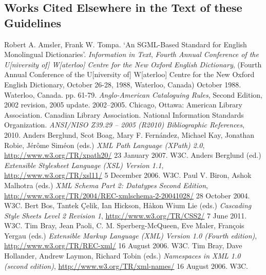 \subsection[{Works Cited Elsewhere in the Text of these Guidelines}]{Works Cited Elsewhere in the Text of these Guidelines}\begin{bibitemlist}{1}
\label{DI-BIBL-1}Robert A. Amsler, Frank W. Tompa. ‘An SGML-Based Standard for English Monolingual Dictionaries’. \textit{Information in Text}, \textit{Fourth Annual Conference of the U[niversity of] W[aterloo] Centre for the New Oxford English Dictionary},  (Fourth Annual Conference of the U[niversity of] W[aterloo] Centre for the New Oxford English Dictionary, October 26-28, 1988, Waterloo, Canada) October 1988. Waterloo, Canada. pp. 61-79. 
\label{HD-BIBL-1}\textit{Anglo-American Cataloguing Rules}, Second Edition, 2002 revision, 2005 update. 2002–2005. Chicago, Ottawa: American Library Association. Canadian Library Association. 
\label{ANSI-NISO-Z39.29}National Information Standards Organization. \textit{ANSI/NISO Z39.29 – 2005 (R2010) Bibliographic References}, 2010. 
\label{XPATH2}Anders Berglund, Scot Boag, Mary F. Fernández, Michael Kay, Jonathan Robie, Jérôme Siméon (eds.) \textit{XML Path Language (XPath) 2.0},  \url{http://www.w3.org/TR/xpath20/} 23 January 2007. W3C. 
\label{XSL11}Anders Berglund (ed.) \textit{Extensible Stylesheet Language (XSL) Version 1.1},  \url{http://www.w3.org/TR/xsl11/} 5 December 2006. W3C. 
\label{XSD2}Paul V. Biron, Ashok Malhotra (eds.) \textit{XML Schema Part 2: Datatypes Second Edition},  \url{http://www.w3.org/TR/2004/REC-xmlschema-2-20041028/} 28 October 2004. W3C. 
\label{CSS21}Bert Bos, Tantek Çelik, Ian Hickson, Håkon Wium Lie (eds.) \textit{Cascading Style Sheets Level 2 Revision 1},  \url{http://www.w3.org/TR/CSS2/} 7 June 2011. W3C. 
\label{XMLREC}Tim Bray, Jean Paoli, C. M. Sperberg-McQueen, Eve Maler, François Yergau (eds.) \textit{Extensible Markup Language (XML) Version 1.0 (Fourth edition)},  \url{http://www.w3.org/TR/REC-xml/} 16 August 2006. W3C. 
\label{NAMESPACES}Tim Bray, Dave Hollander, Andrew Laymon, Richard Tobin (eds.) \textit{Namespaces in XML 1.0 (second edition)},  \url{http://www.w3.org/TR/xml-names/} 16 August 2006. W3C. 

\end{bibitemlist}

